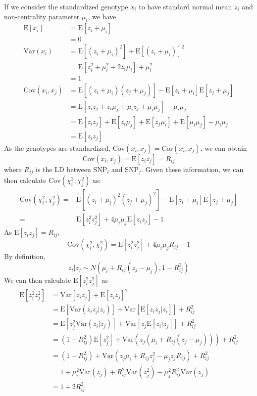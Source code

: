 			If we consider the standardized genotype $x_i$ to have standard normal mean $z_i$ and non-centrality parameter $\mu_i$, we have
			\begin{align*}
				\mathrm{E}[x_i]&=\mathrm{E}[z_i+\mu_i]\\
				&=0\\
				\mathrm{Var}(x_i) &=\mathrm{E}[(z_i+\mu_i)^2]+\mathrm{E}[(z_i+\mu_i)]^2\\
				&=\mathrm{E}[z_i^2+\mu_i^2+2z_i\mu_i]+\mu_i^2\\
				&=1 \\
				\mathrm{Cov}(x_i,x_j)&=\mathrm{E}[(z_i+\mu_i)(z_j+\mu_j)]-\mathrm{E}[z_i+\mu_i]\mathrm{E}[z_j+\mu_j]\\
				&=\mathrm{E}[z_iz_j+z_i\mu_j+\mu_iz_j+\mu_i\mu_j]-\mu_i\mu_j\\
				&=\mathrm{E}[z_iz_j]+\mathrm{E}[z_i\mu_j]+\mathrm{E}[z_j\mu_i]+\mathrm{E}[\mu_i\mu_j]-\mu_i\mu_j\\
				&=\mathrm{E}[z_iz_j]
			\end{align*}
			As the genotypes are standardized, $\mathrm{Cov}(x_i,x_j)=\mathrm{Cor}(x_i,x_j)$, we can obtain
			$$
				\mathrm{Cov}(x_i,x_j)=\mathrm{E}[z_iz_j]=R_{ij}
			$$
			where $R_{ij}$ is the \gls{LD} between \gls{SNP}$_i$ and \gls{SNP}$_j$.
			Given these information, we can then calculate $\mathrm{Cov}(\chi_i^2,\chi_j^2)$ as:
			\begin{align*}
				\mathrm{Cov}(\chi_i^2,\chi_j^2)=&\mathrm{E}[(z_i+\mu_i)^2(z_j+\mu_j)^2]-\mathrm{E}[z_i+\mu_i]\mathrm{E}[z_j+\mu_j]\\
				=&\mathrm{E}[z_i^2z_j^2]+4\mu_i\mu_j\mathrm{E}[z_iz_j]-1
			\end{align*}
			As $\mathrm{E}[z_iz_j] = R_{ij}$,
			$$
				\mathrm{Cov}(\chi_i^2, \chi_j^2)=\mathrm{E}[z_i^2z_j^2]+4\mu_i\mu_jR_{ij}-1
			$$
			By definition, 
			$$
				z_i|z_j\sim N(\mu_i+R_{ij}(z_j-\mu_j),1-R_{ij}^2)
			$$
			We can then calculate $\mathrm{E}[z_i^2z_j^2]$ as
			\begin{align*}
				\mathrm{E}[z_i^2z_j^2]&=\mathrm{Var}[z_iz_j]+\mathrm{E}[z_iz_j]^2\\
				&=\mathrm{E}[\mathrm{Var}(z_iz_j|z_i)]+\mathrm{Var}[\mathrm{E}[z_iz_j|z_i]]+R_{ij}^2\\
				&=\mathrm{E}[z_j^2\mathrm{Var}(z_i|z_j)]+\mathrm{Var}[z_j\mathrm{E}[z_i|z_j]]+R_{ij}^2\\
				&=(1-R_{ij}^2)\mathrm{E}[z_j^2]+\mathrm{Var}(z_j(\mu_i+R_{ij}(z_j-\mu_j)))+R_{ij}^2\\
				&=(1-R_{ij}^2)+\mathrm{Var}(z_j\mu_i+R_{ij}z_j^2-\mu_jz_jR_{ij})+R_{ij}^2\\
				&=1+\mu_i^2\mathrm{Var}(z_j)+R_{ij}^2\mathrm{Var}(z_j^2)-\mu_j^2R_{ij}^2\mathrm{Var}(z_j)\\
				&=1+2R_{ij}^2
			\end{align*}
